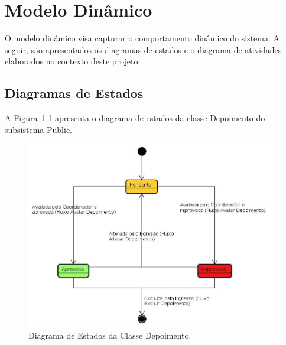
\chapter{Modelo Dinâmico}
\label{sec-modelo-dinamico}

O modelo dinâmico visa capturar o comportamento dinâmico do sistema. A seguir, são
apresentados os diagramas de estados e o diagrama de atividades elaborados no contexto deste
projeto.


\section{Diagramas de Estados}


A Figura~\ref{figura-estado-depoimento} apresenta o diagrama de estados da classe Depoimento do subsistema Public.

\begin{figure}[h]
  \centering
  \includegraphics[scale=0.45]{figuras/estado-depoimento.jpg}
  \caption{Diagrama de Estados da Classe Depoimento.}
  \label{figura-estado-depoimento}
\end{figure}
